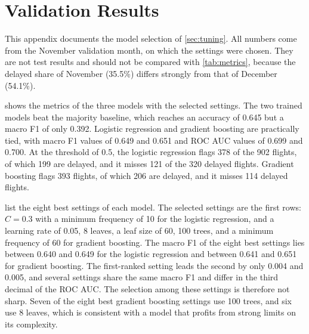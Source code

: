 \section{Validation Results}\label{app:validation}

This appendix documents the model selection of \cref{sec:tuning}. All numbers come from the November validation month, on which the settings were chosen. They are not test results and should not be compared with \cref{tab:metrics}, because the delayed share of November (35.5\%) differs strongly from that of December (54.1\%).

 shows the metrics of the three models with the selected settings. The two trained models beat the majority baseline, which reaches an accuracy of 0.645 but a macro F1 of only 0.392. Logistic regression and gradient boosting are practically tied, with macro F1 values of 0.649 and 0.651 and ROC AUC values of 0.699 and 0.700. At the threshold of 0.5, the logistic regression flags 378 of the 902 flights, of which 199 are delayed, and it misses 121 of the 320 delayed flights. Gradient boosting flags 393 flights, of which 206 are delayed, and it misses 114 delayed flights.



 list the eight best settings of each model. The selected settings are the first rows: $C=0.3$ with a minimum frequency of 10 for the logistic regression, and a learning rate of 0.05, 8 leaves, a leaf size of 60, 100 trees, and a minimum frequency of 60 for gradient boosting. The macro F1 of the eight best settings lies between 0.640 and 0.649 for the logistic regression and between 0.641 and 0.651 for gradient boosting. The first-ranked setting leads the second by only 0.004 and 0.005, and several settings share the same macro F1 and differ in the third decimal of the ROC AUC. The selection among these settings is therefore not sharp. Seven of the eight best gradient boosting settings use 100 trees, and six use 8 leaves, which is consistent with a model that profits from strong limits on its complexity.




